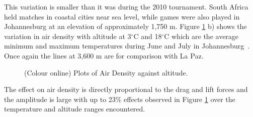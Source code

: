 \documentclass[a4paper]{article}
\begin{document}
This variation is smaller than it was during the 2010 tournament.  South Africa held matches in coastal cities near sea level, while games were also played in Johannesburg at an elevation of approximately 1,750 m.  Figure \ref{fig:AirDensityvsAltitude} b) shows the variation in air density with altitude at 3$^{\circ}$C and 18$^{\circ}$C which are the average minimum and maximum temperatures during June and July in Johannesburg~\cite{WeatherWebsite}.  Once again the lines at 3,600 m are for comparison with La Paz.
%
%
\begin{figure}[t] 
  \begin{center} 
  \captionsetup[subfigure]{width=0.42\textwidth}
 \end{center}
\vspace{-0.5cm}
 \caption{(Colour online) Plots of Air Density against altitude.}
 \label{fig:AirDensityvsAltitude}
\end{figure}
The effect on air density is directly proportional to the drag and lift forces and the amplitude is large with up to 23\% effects observed in Figure \ref{fig:AirDensityvsAltitude} over the temperature and altitude ranges encountered.

%
%
\end{document}
